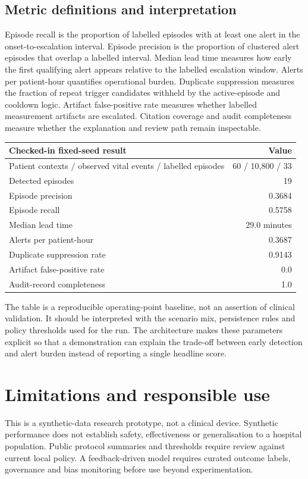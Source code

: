 \documentclass[11pt,a4paper]{article}
\begin{document}
\subsection{Metric definitions and interpretation}
Episode recall is the proportion of labelled episodes with at least one alert in the onset-to-escalation interval. Episode precision is the proportion of clustered alert episodes that overlap a labelled interval. Median lead time measures how early the first qualifying alert appears relative to the labelled escalation window. Alerts per patient-hour quantifies operational burden. Duplicate suppression measures the fraction of repeat trigger candidates withheld by the active-episode and cooldown logic. Artifact false-positive rate measures whether labelled measurement artifacts are escalated. Citation coverage and audit completeness measure whether the explanation and review path remain inspectable.

\begin{center}
\begin{tabular}{lr}
\textbf{Checked-in fixed-seed result} & \textbf{Value} \\
\hline
Patient contexts / observed vital events / labelled episodes & 60 / 10,800 / 33 \\
Detected episodes & 19 \\
Episode precision & 0.3684 \\
Episode recall & 0.5758 \\
Median lead time & 29.0 minutes \\
Alerts per patient-hour & 0.3687 \\
Duplicate suppression rate & 0.9143 \\
Artifact false-positive rate & 0.0 \\
Audit-record completeness & 1.0 \\
\end{tabular}
\end{center}

The table is a reproducible operating-point baseline, not an assertion of clinical validation. It should be interpreted with the scenario mix, persistence rules and policy thresholds used for the run. The architecture makes these parameters explicit so that a demonstration can explain the trade-off between early detection and alert burden instead of reporting a single headline score.

\section{Limitations and responsible use}
This is a synthetic-data research prototype, not a clinical device. Synthetic performance does not establish safety, effectiveness or generalisation to a hospital population. Public protocol summaries and thresholds require review against current local policy. A feedback-driven model requires curated outcome labels, governance and bias monitoring before use beyond experimentation.
\end{document}
